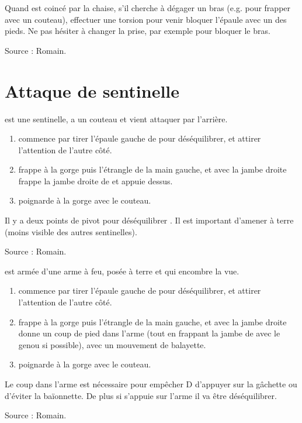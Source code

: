 \begin{technique}
Quand \D est coincé par la chaise, s'il cherche à dégager un bras (e.g. pour frapper avec un couteau), effectuer une torsion pour venir bloquer l'épaule avec un des pieds.
Ne pas hésiter à changer la prise, par exemple pour bloquer le bras.

Source : Romain.
\end{technique}


\section{Attaque de sentinelle}

\D est une sentinelle, \A a un couteau et vient attaquer \D par l'arrière.


\begin{technique}

\begin{enumerate}
	\item \A commence par tirer l'épaule gauche de \D pour déséquilibrer, et attirer l'attention de l'autre côté.
	
	\item \A frappe \D à la gorge puis l'étrangle de la main gauche, et avec la jambe droite frappe la jambe droite de \D et appuie dessus.
	
	\item \A poignarde \D à la gorge avec le couteau.
\end{enumerate}

Il y a deux points de pivot pour déséquilibrer \D.
Il est important d'amener \D à terre (moins visible des autres sentinelles).

Source : Romain.
\end{technique}


\begin{technique}

\D est armée d'une arme à feu, posée à terre et qui encombre la vue.

\begin{enumerate}
	\item \A commence par tirer l'épaule gauche de \D pour déséquilibrer, et attirer l'attention de l'autre côté.
	
	\item \A frappe \D à la gorge puis l'étrangle de la main gauche, et avec la jambe droite donne un coup de pied dans l'arme (tout en frappant la jambe de \D avec le genou si possible), avec un mouvement de balayette.
	
	\item \A poignarde \D à la gorge avec le couteau.
\end{enumerate}

Le coup dans l'arme est nécessaire pour empêcher D d'appuyer sur la gâchette ou d'éviter la baïonnette.
De plus si \D s'appuie sur l'arme il va être déséquilibrer.

Source : Romain.
\end{technique}


